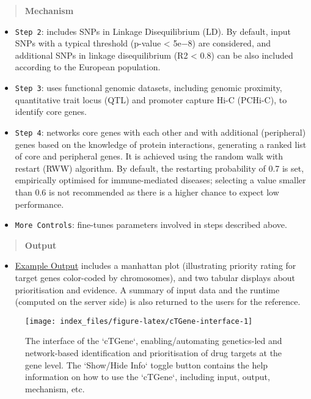 \documentclass[
  oneside]{book}
\providecommand{\tightlist}{%
  \setlength{\itemsep}{0pt}\setlength{\parskip}{0pt}}
\begin{document}
\begin{quote}
\textbf{Mechanism}
\end{quote}

\begin{itemize}
\item
  \texttt{Step\ 2}: includes SNPs in Linkage Disequilibrium (LD). By default, input SNPs with a typical threshold (p-value \textless{} 5e−8) are considered, and additional SNPs in linkage disequilibrium (R2 \textless{} 0.8) can be also included according to the European population.
\item
  \texttt{Step\ 3}: uses functional genomic datasets, including genomic proximity, quantitative trait locus (QTL) and promoter capture Hi-C (PCHi-C), to identify core genes.
\item
  \texttt{Step\ 4}: networks core genes with each other and with additional (peripheral) genes based on the knowledge of protein interactions, generating a ranked list of core and peripheral genes. It is achieved using the random walk with restart (RWW) algorithm. By default, the restarting probability of 0.7 is set, empirically optimised for immune-mediated diseases; selecting a value smaller than 0.6 is not recommended as there is a higher chance to expect low performance.
\item
  \texttt{More\ Controls}: fine-tunes parameters involved in steps described above.
\end{itemize}

\begin{quote}
\textbf{Output}
\end{quote}

\begin{itemize}
\tightlist
\item
  \href{/app/examples/_tmp_RMD_cTGene.html}{Example Output} includes a manhattan plot (illustrating priority rating for target genes color-coded by chromosomes), and two tabular displays about prioritisation and evidence. A summary of input data and the runtime (computed on the server side) is also returned to the users for the reference.
\end{itemize}

\begin{figure}

{\centering \texttt{[image: index\_files/figure-latex/cTGene-interface-1]} 

}

\caption{The interface of the `cTGene`, enabling/automating genetics-led and network-based identification and prioritisation of drug targets at the gene level. The `Show/Hide Info` toggle button contains the help information on how to use the `cTGene`, including input, output, mechanism, etc.}\label{fig:cTGene-interface}
\end{figure}
\end{document}
